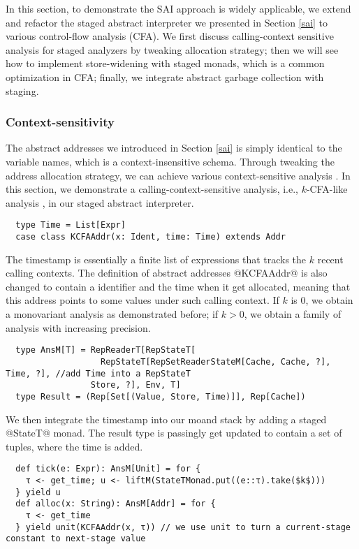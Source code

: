 In this section, to demonstrate the SAI approach is widely applicable, we extend
and refactor the staged abstract interpreter we presented in Section \ref{sai}
to various control-flow analysis (CFA). We first discuss calling-context
sensitive analysis for staged analyzers by tweaking allocation strategy; then we
will see how to implement store-widening with staged monads, which is a common
optimization in CFA; finally, we integrate abstract garbage collection with
staging.

\subsubsection{Context-sensitivity}

The abstract addresses we introduced in Section \ref{sai} is simply identical to
the variable names, which is a context-insensitive schema.
Through tweaking the address allocation strategy, we can achieve various
context-sensitive analysis \cite{DBLP:conf/icfp/Gilray0M16}. In this section, we
demonstrate a calling-context-sensitive analysis, i.e., $k$-CFA-like analysis
\cite{DBLP:journals/jfp/HornM12}, in our staged abstract interpreter.

\begin{lstlisting}
  type Time = List[Expr]
  case class KCFAAddr(x: Ident, time: Time) extends Addr
\end{lstlisting}

The timestamp is essentially a finite list of expressions that tracks the $k$
recent calling contexts. The definition of abstract addresses @KCFAAddr@ is also
changed to contain a identifier and the time when it get allocated, meaning that
this address points to some values under such calling context. If $k$ is 0, we
obtain a monovariant analysis as demonstrated before; if $k > 0$, we obtain a
family of analysis with increasing precision.

\begin{lstlisting}
  type AnsM[T] = RepReaderT[RepStateT[
                   RepStateT[RepSetReaderStateM[Cache, Cache, ?], Time, ?], //add Time into a RepStateT
                 Store, ?], Env, T]
  type Result = (Rep[Set[(Value, Store, Time)]], Rep[Cache])
\end{lstlisting}

We then integrate the timestamp into our moand stack by adding a staged
@StateT@ monad. The result type is passingly get updated to contain a set of
tuples, where the time is added.

\begin{lstlisting}
  def tick(e: Expr): AnsM[Unit] = for {
    τ <- get_time; u <- liftM(StateTMonad.put((e::τ).take($k$)))
  } yield u
  def alloc(x: String): AnsM[Addr] = for {
    τ <- get_time
  } yield unit(KCFAAddr(x, τ)) // we use unit to turn a current-stage constant to next-stage value
\end{lstlisting}

